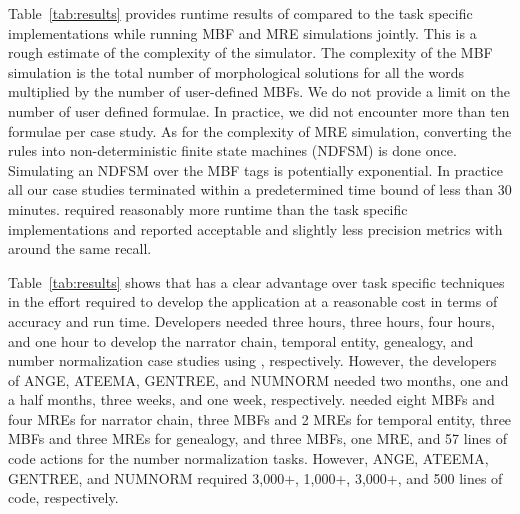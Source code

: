 Table~\ref{tab:results} provides runtime results of \framework 
compared to the task specific implementations while running 
MBF and MRE simulations jointly.
This is a rough estimate of the complexity of the \framework simulator. 
%
The complexity of the MBF simulation is the total number of morphological 
solutions for all the words multiplied by the number of user-defined MBFs.
We do not provide a limit on the number of user defined formulae.
In practice, we did not encounter more than ten formulae per case study.
As for the complexity of MRE simulation, converting the rules into 
non-deterministic finite state machines (NDFSM) is done once. 
Simulating an NDFSM over the MBF tags is potentially exponential. 
In practice all our case studies terminated within a predetermined 
time bound of less than 30 minutes. 
\framework required reasonably more runtime than the task specific 
implementations and reported acceptable and 
slightly less precision metrics with around
the same recall.



Table~\ref{tab:results} shows that \framework has a clear advantage over 
task specific techniques in the effort required to develop the application at 
a reasonable cost in terms of accuracy and run time. 
Developers needed three hours, three hours, four hours, and one hour 
to develop the narrator chain, temporal entity, genealogy, and number 
normalization case studies using \framework, respectively. 
However, the developers of ANGE, ATEEMA, GENTREE, and 
NUMNORM needed two months, one and a half months, 
three weeks, and one week, respectively. 
\framework needed eight MBFs and four MREs for narrator chain, 
three MBFs and 2 MREs for temporal entity, three MBFs and three MREs for 
genealogy, and three MBFs, one MRE, and 57 lines of code actions for the number normalization tasks. 
However, ANGE, ATEEMA, GENTREE, and NUMNORM required 
3,000+, 1,000+, 3,000+, and 500 lines of code, respectively.

